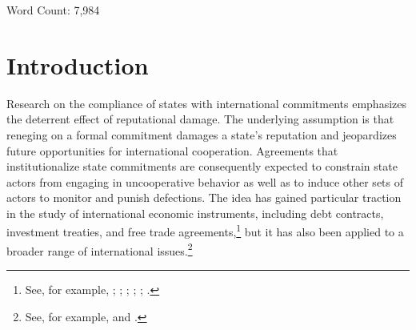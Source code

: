\documentclass[12pt,onesided]{amsart}
\begin{document}
\begin{center}
Word Count: 7,984
\end{center}

\newpage

\setcounter{page}{1}
\doublespacing

\section*{Introduction}

Research on the compliance of states with international commitments emphasizes the deterrent effect of reputational damage. The underlying assumption is that reneging on a formal commitment damages a state's reputation and jeopardizes future opportunities for international cooperation. Agreements that institutionalize state commitments are consequently expected to constrain state actors from engaging in uncooperative behavior as well as to induce other sets of actors to monitor and punish defections. The idea has gained particular traction in the study of international economic instruments, including debt contracts, investment treaties, and free trade agreements,\footnote{See, for example, \citet{simmons:2000}; \citet{tomz:2007}; \citet{buthe:milner:2014}; \citet{buthe:milner:2008}; \citet{allee:peinhardt:2011}; \citet{elkins:etal:2006}.} but it has also been applied to a broader range of international issues.\footnote{See, for example, \citet{fearon:1997} and \citet{simmons:danner:2010}.}
\end{document}
